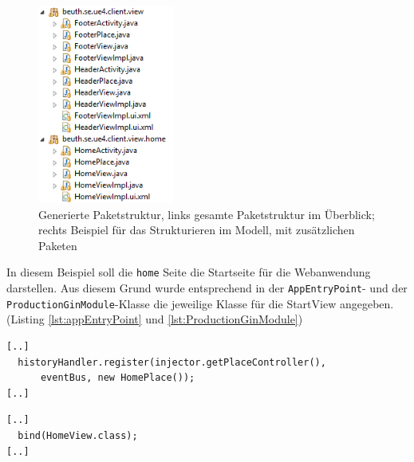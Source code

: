 \begin{figure}[htbp]
\begin{center}
\includegraphics[width=0.4\textwidth]{./img/PackagesExample.png}
\caption{Generierte Paketstruktur, links gesamte
Paketstruktur im Überblick; rechts Beispiel für das
Strukturieren im Modell, mit zusätzlichen Paketen}\label{Fig:packegeModel}
\end{center}
\end{figure}
 
In diesem Beispiel soll die \texttt{home} Seite die Startseite für die
Webanwendung darstellen. Aus diesem Grund wurde entsprechend in der
\texttt{AppEntryPoint}- und der \texttt{ProductionGinModule}-Klasse die
jeweilige Klasse für die StartView angegeben. (Listing \ref{lst:appEntryPoint}
und \ref{lst:ProductionGinModule}) 
\lstset{language=gwt}
\begin{lstlisting}[caption={Änderung an der \texttt{AppEntryPoint}-Klasse zur
Bestimmung der Startseite}, label={lst:appEntryPoint}] 
[..]
  historyHandler.register(injector.getPlaceController(), 
      eventBus, new HomePlace());
[..]
\end{lstlisting}
\lstset{language=gwt}
\begin{lstlisting}[caption={Änderung an der \texttt{ProductionGinModule}-Klasse
zur Bestimmung der Startseite}, label={lst:ProductionGinModule}] 
[..]
  bind(HomeView.class);
[..]
\end{lstlisting}

